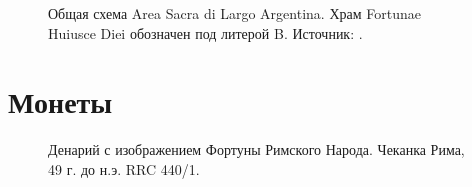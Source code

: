 \begin{appendices}
\begin{figure}[ht!]
\caption{Общая схема Area Sacra di Largo Argentina. Храм Fortunae Huiusce Diei обозначен под литерой B. \footnotesize{Источник: \cite[P. 34]{Richardson1992}}. }
\end{figure}

\chapter{Монеты}

\begin{figure}[ht!]
\caption{Денарий с изображением Фортуны Римского Народа. Чеканка Рима, 49 г. до н.э. RRC 440/1. }\label{pic:RRC440}
\end{figure}


\end{appendices}
